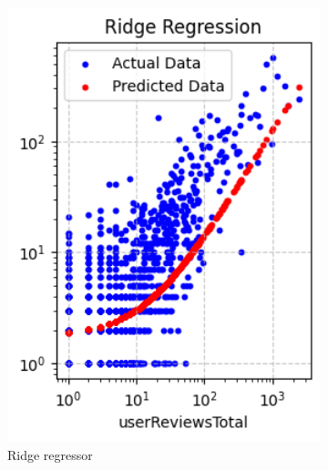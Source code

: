 \begin{figure}[H]
\begin{subfigure}{0.2565\textwidth}
        \label{fig:linear}
    \end{subfigure}
    \begin{subfigure}{0.24\textwidth}
        \centering
        \includegraphics[width=1\textwidth]{plots/ridge.png}
        \caption{Ridge regressor}
        \captionsetup{width=0.9\linewidth, justification=centering}
        \label{fig:ridge}
    \end{subfigure}
    \begin{subfigure}{0.24\textwidth}
        \centering

\end{subfigure}
\end{figure}

